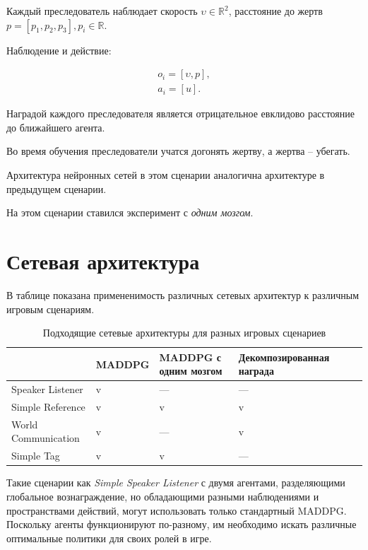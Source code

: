 Каждый преследователь наблюдает скорость $\upsilon \in \mathbb{R}^2$, расстояние до жертв $p = [p_1, p_2, p_3], p_i \in \mathbb{R}$.

Наблюдение и действие:

\begin{equation}
    \begin{multlined}
        o_i = [\upsilon, p], \\
        a_i = [u].
    \end{multlined}
\end{equation}

Наградой каждого преследователя является отрицательное евклидово расстояние до ближайшего агента.

Во время обучения преследователи учатся догонять жертву, а жертва – убегать.

Архитектура нейронных сетей в этом сценарии аналогична архитектуре в предыдущем сценарии.

На этом сценарии ставился эксперимент с \textit{одним мозгом}.

\section{Сетевая архитектура} \label{network-architecture}

В таблице  показана примененимость различных сетевых архитектур к различным игровым сценариям.

\begin{table}[t!]
	\centering\small
	\caption{Подходящие сетевые архитектуры для разных игровых сценариев}
	\label{tab-algs-application}
	\begin{tabular}{|l|l|l|l|l|l|}
		\hline
		& MADDPG & MADDPG с одним мозгом & Декомпозированная награда \\
		\hline
		Speaker Listener    & v & --- & --- \\ \hline
		Simple Reference    & v & v & v   \\ \hline
		World Communication & v & --- & v \\ \hline
		Simple Tag          & v & v & --- \\ \hline
	\end{tabular}
	\normalsize%
\end{table}

Такие сценарии как \textit{Simple Speaker Listener} с двумя агентами, разделяющими глобальное вознаграждение, но обладающими разными наблюдениями и пространствами действий, могут использовать только стандартный MADDPG. Поскольку агенты функционируют по-разному, им необходимо искать различные оптимальные политики для своих ролей в игре.

